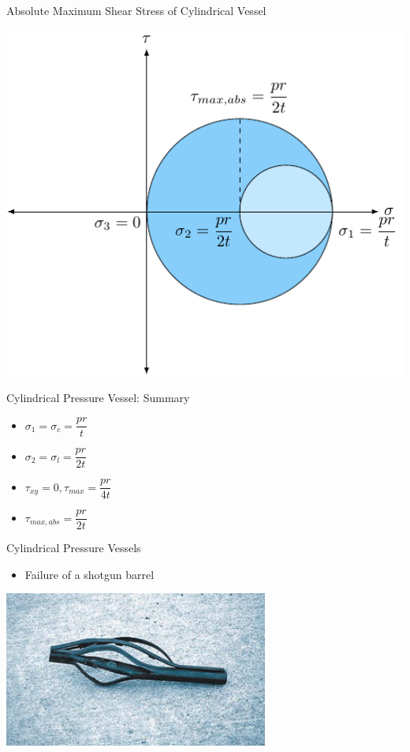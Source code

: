 \documentclass[10pt, svgnames]{beamer}
\begin{document}
\begin{frame}[label={sec:org11f31ef}]{Absolute Maximum Shear Stress of Cylindrical Vessel}
\begin{center}
\includegraphics[width=.9\linewidth]{pictures/abs-max-shear-cyl-vessel.pdf}
\end{center}
\end{frame}

\begin{frame}[label={sec:orgef7e2b8}]{Cylindrical Pressure Vessel: Summary}
\begin{itemize}
\item \(\sigma_1 = \sigma_c = \dfrac{pr}{t}\)
\item \(\sigma_2 = \sigma_l = \dfrac{pr}{2t}\)
\item \(\tau_{xy} = 0, \tau_{max} = \dfrac{pr}{4t}\)
\item \(\tau_{max,abs} = \dfrac{pr}{2t}\)
\end{itemize}
\end{frame}

\begin{frame}[label={sec:orgeab885b}]{Cylindrical Pressure Vessels}
\begin{itemize}
\item Failure of a shotgun barrel
\end{itemize}

\begin{center}
\includegraphics[width=.9\linewidth]{./pictures/shotgun-barrel.png}
\end{center}
\end{frame}
\end{document}
